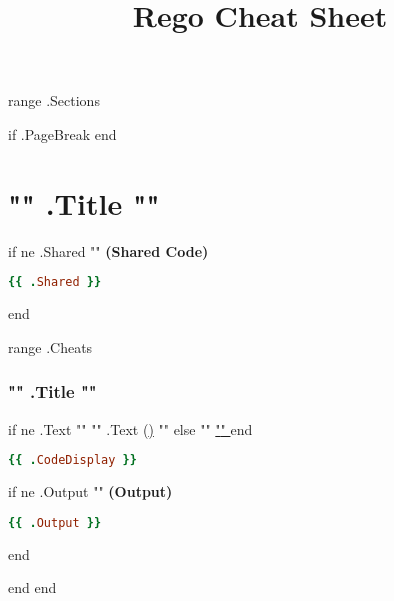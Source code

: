 \documentclass[twocolumn]{article}
\makeatletter
\renewcommand{\maketitle}{\bgroup\setlength{\parindent}{0pt}
\textbf{\LARGE{\@title}}
}
\makeatother
\begin{document}
\pagestyle{logo}
\title{Rego Cheat Sheet}

\maketitle
\vspace{-1em}

{{ range .Sections }}

{{ if .PageBreak }}
\newpage
{{ end}}

\section*{{ "{" }}{{ .Title }}  {{ "}" }}

{{ if ne .Shared "" }}
\textbf{\tiny{(Shared Code)}}
\begin{lstlisting}[language=Ruby]
{{ .Shared }}
\end{lstlisting}
{{ end }}

{{ range .Cheats }}
\vspace{-0.5em}
\subsubsection*{{ "{" }}{{ .Title }}{{ "}" }}

{{ if ne .Text "" }}
\footnotesize{{ "{" }}{{ .Text }} (\href{{ "{" }}{{ .PlaygroundLink }}{{ "}{" }}Playground{{ "}" }}){{ "}" }}
{{ else }}
\footnotesize{{ "{" }}\href{{ "{" }}{{ .PlaygroundLink }}{{ "}{" }}Playground{{ "}" }}{{ "}" }}
{{ end }}

\begin{lstlisting}[language=Ruby]
{{ .CodeDisplay }}
\end{lstlisting}


{{ if ne .Output "" }}
\textbf{\tiny{(Output)}}
\begin{lstlisting}[language=Ruby]
{{ .Output }}
\end{lstlisting}
{{ end }}

{{ end }}
{{ end }}
\end{document}

